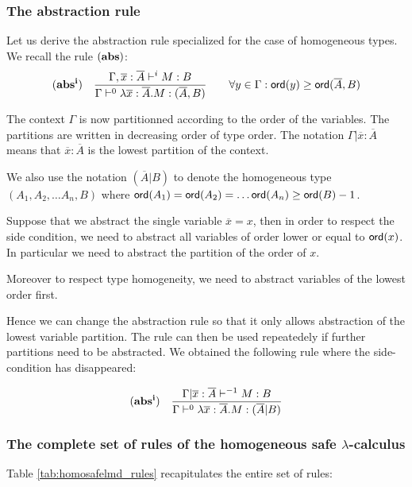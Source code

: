 \subsubsection{The abstraction rule}

Let us derive the abstraction rule specialized for the case of
homogeneous types. We recall the rule $\mathbf{(abs)}$:
$$ \mathbf{(abs^i)} \quad  \frac{\displaystyle \Gamma, \overline{x} : \overline{A} \vdash^{i} M : B}{\Gamma  \vdash^{0} \lambda \overline{x} : \overline{A} . M : (\overline{A},B)} \qquad
                                   \forall y \in \Gamma : {\sf ord}(y) \geq {\sf ord}(\overline{A},B)$$

The context $\Gamma$ is now partitionned according to the order of
the variables. The partitions are written in decreasing order of
type order. The notation $\Gamma | \overline{x}:\overline{A}$ means
that $\overline{x}:\overline{A}$ is the lowest partition of the
context.

We also use the notation $(\overline{A}|B)$ to denote the
homogeneous type $(A_1, A_2, \ldots A_n, B)$ where ${\sf ord}(A_1) =
{\sf ord}(A_2) =  \ldots {\sf ord}(A_n) \geq {\sf ord}(B) -1$.


Suppose that we abstract the single variable $\overline{x} = x$,
then in order to respect the side condition, we need to abstract all
variables of order lower or equal to ${\sf ord}(x)$. In particular we
need to abstract the partition of the order of $x$.

Moreover to respect type homogeneity, we need to abstract variables
of the lowest order first.

Hence we can change the abstraction rule so that it only allows
abstraction of the lowest variable partition. The rule can then be
used repeatedely if further partitions need to be abstracted. We
obtained the following rule where the side-condition has
disappeared:

$$ \mathbf{(abs^i)} \quad  \frac{\displaystyle \Gamma| \overline{x} : \overline{A} \vdash^{-1} M : B}{\Gamma  \vdash^{0} \lambda \overline{x} : \overline{A} . M : (\overline{A}|B)}$$


\subsubsection{The complete set of rules of the homogeneous safe $\lambda$-calculus}

Table \ref{tab:homosafelmd_rules} recapitulates the entire set of rules:

